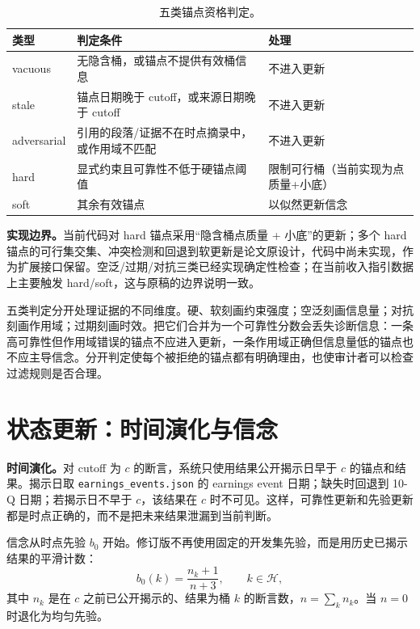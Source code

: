 \begin{table}[H]
\centering
{}
\caption{五类锚点资格判定。}
\label{tab:qualification}
\begin{tabular}{p{2.2cm}p{5.2cm}p{4.8cm}}
\toprule
类型 & 判定条件 & 处理 \\
\midrule
\rowcolor{yellow!18} vacuous & 无隐含桶，或锚点不提供有效桶信息 & 不进入更新 \\
\rowcolor{yellow!18} stale & 锚点日期晚于 cutoff，或来源日期晚于 cutoff & 不进入更新 \\
\rowcolor{yellow!18} adversarial & 引用的段落/证据不在时点摘录中，或作用域不匹配 & 不进入更新 \\
\rowcolor{yellow!18} hard & 显式约束且可靠性不低于硬锚点阈值 & 限制可行桶（当前实现为点质量+小底） \\
\rowcolor{yellow!18} soft & 其余有效锚点 & 以似然更新信念 \\
\bottomrule
\end{tabular}
\end{table}

\begin{revbox}
\noindent\textbf{实现边界。}当前代码对 hard 锚点采用“隐含桶点质量 + 小底”的更新；多个 hard 锚点的可行集交集、冲突检测和回退到软更新是论文原设计，代码中尚未实现，作为扩展接口保留。空泛/过期/对抗三类已经实现确定性检查；在当前收入指引数据上主要触发 hard/soft，这与原稿的边界说明一致。
\end{revbox}

五类判定分开处理证据的不同维度。硬、软刻画约束强度；空泛刻画信息量；对抗刻画作用域；过期刻画时效。把它们合并为一个可靠性分数会丢失诊断信息：一条高可靠性但作用域错误的锚点不应进入更新，一条作用域正确但信息量低的锚点也不应主导信念。分开判定使每个被拒绝的锚点都有明确理由，也使审计者可以检查过滤规则是否合理。

\section{状态更新：时间演化与信念}

\begin{revbox}
\noindent\textbf{时间演化。}对 cutoff 为 $c$ 的断言，系统只使用结果公开揭示日早于 $c$ 的锚点和结果。揭示日取 \texttt{earnings\_events.json} 的 earnings event 日期；缺失时回退到 10-Q 日期；若揭示日不早于 $c$，该结果在 $c$ 时不可见。这样，可靠性更新和先验更新都是时点正确的，而不是把未来结果泄漏到当前判断。
\end{revbox}

信念从时点先验 $b_0$ 开始。修订版不再使用固定的开发集先验，而是用历史已揭示结果的平滑计数：
\begin{equation}
b_0(k)=\frac{n_k+1}{n+3},\qquad k\in\mathcal H,
\end{equation}
其中 $n_k$ 是在 $c$ 之前已公开揭示的、结果为桶 $k$ 的断言数，$n=\sum_k n_k$。当 $n=0$ 时退化为均匀先验。

